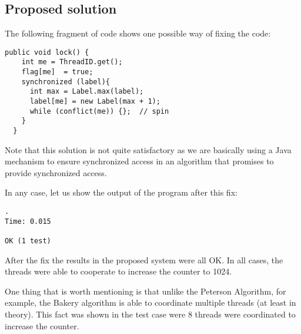 \subsection{Proposed solution}
\par
The following fragment of code shows one possible way of fixing the code:
\par
\hfill
\begin{lstlisting}[style=numbers]
  public void lock() {
    int me = ThreadID.get();
    flag[me]  = true;
    synchronized (label){
      int max = Label.max(label);
      label[me] = new Label(max + 1);
      while (conflict(me)) {};  // spin
    }
  }
\end{lstlisting}
\hfill
Note that this solution is not quite satisfactory as we are basically using a
Java mechanism to ensure synchronized access in an algorithm that promises to
provide synchronized access.
\par
In any case, let us show the output of the program after this fix:
\begin{verbatim}
.
Time: 0.015

OK (1 test)
\end{verbatim}
\hfill
\par
After the fix the results in the proposed system were all OK. In all cases, the
threads were able to cooperate to increase the counter to 1024.
\par
One thing that is worth mentioning is that unlike the Peterson Algorithm, for
example, the Bakery algorithm is able to coordinate multiple threads (at least
in theory). This fact was shown in the test case were 8 threads were coordinated
to increase the counter.
